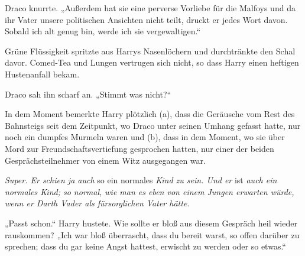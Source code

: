 Draco knurrte.
„Außerdem hat sie eine perverse Vorliebe für die Malfoys und da ihr Vater unsere politischen Ansichten nicht teilt, druckt er jedes Wort davon. Sobald ich alt genug bin, werde ich sie vergewaltigen.“

Grüne Flüssigkeit spritzte aus Harrys Nasenlöchern und durchtränkte den Schal davor. Comed-Tea und Lungen vertrugen sich nicht, so dass Harry einen heftigen Hustenanfall bekam.

Draco sah ihn scharf an.
„Stimmt was nicht?“

In dem Moment bemerkte Harry plötzlich (a), dass die Geräusche vom Rest des Bahnsteigs seit dem Zeitpunkt, wo Draco unter seinen Umhang gefasst hatte, nur noch ein dumpfes Murmeln waren und (b), dass in dem Moment, wo sie über Mord zur Freundschaftsvertiefung gesprochen hatten, nur einer der beiden Gesprächsteilnehmer von einem Witz ausgegangen war.

\emph{Super. Er schien ja auch} so ein normales \emph{Kind zu sein. Und er} ist \emph{auch ein normales Kind; so normal, wie man es eben von einem Jungen erwarten würde, wenn er Darth Vader als fürsorglichen Vater hätte.}

„Passt schon.“ Harry hustete. Wie sollte er bloß aus diesem Gespräch heil wieder rauskommen?
„Ich war bloß überrascht, dass du bereit warst, so offen darüber zu sprechen; dass du gar keine Angst hattest, erwischt zu werden oder so etwas.“

